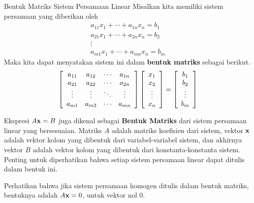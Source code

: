 \begin{definition}{Bentuk Matriks Sistem Persamaan Linear}\label{def:matrixform}
Misalkan kita memiliki sistem persamaan yang diberikan oleh
\begin{equation*}
\begin{array}{c}
a_{11}x_{1}+\cdots +a_{1n}x_{n}=b_{1} \\
a_{21}x_{1}+ \cdots + a_{2n}x_{n} = b_{2} \\
\vdots \\
a_{m1}x_{1}+\cdots +a_{mn}x_{n}=b_{m}
\end{array}
\end{equation*}
Maka kita dapat menyatakan sistem ini dalam \textbf{bentuk matriks}  sebagai berikut.
\begin{equation*}
\left[
\begin{array}{cccc}
a_{11} & a_{12} & \cdots & a_{1n} \\
a_{21} & a_{22} & \cdots & a_{2n} \\
\vdots & \vdots & \ddots & \vdots \\
a_{m1} & a_{m2} & \cdots & a_{mn}
\end{array}
\right]
\left[
\begin{array}{c}
x_{1} \\
x_{2} \\
\vdots \\
x_{n}
\end{array}
\right]
=
\left[
\begin{array}{c}
b_{1}\\
b_{2}\\
\vdots \\
b_{m}
\end{array}
\right]
\end{equation*}
 
\end{definition}

Ekspresi $A\mathbf{x}=B$ juga dikenal sebagai \textbf{Bentuk Matriks} dari
sistem persamaan linear yang bersesuaian.  Matriks
$A$ adalah matriks koefisien dari sistem, vektor
$\mathbf{x}$ adalah vektor kolom yang dibentuk dari variabel-variabel sistem,
dan akhirnya vektor $B$ adalah vektor kolom yang dibentuk dari konstanta-konstanta
sistem. Penting untuk diperhatikan bahwa setiap sistem persamaan linear
dapat ditulis dalam bentuk ini.

Perhatikan bahwa jika sistem persamaan homogen ditulis dalam bentuk matriks, bentuknya adalah
$A\mathbf{x}=0$, untuk vektor nol $0$.

